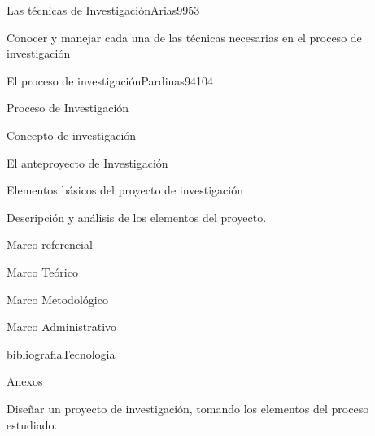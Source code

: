 \begin{syllabus}
\begin{unit}{Las técnicas de Investigación}{Arias99}{5}{3}
   \begin{unitgoals}
      \item Conocer y manejar cada una de las técnicas necesarias en el proceso de investigación
   \end{unitgoals}
\end{unit}

\begin{unit}{El proceso de investigación}{Pardinas94}{10}{4}
   \begin{topics}
      \item Proceso de Investigación
	\item Concepto de investigación
	\item El anteproyecto de Investigación 
	\item Elementos básicos del proyecto de investigación
	\item Descripción y análisis de los elementos del proyecto.
	\item Marco referencial
	\item Marco Teórico
	\item Marco Metodológico
	\item Marco Administrativo
	\item bibliografiaTecnologia 
	\item Anexos
   \end{topics}

   \begin{unitgoals}
      \item Diseñar un proyecto de investigación, tomando los elementos del proceso estudiado.
   \end{unitgoals}
\end{unit}

\begin{coursebibliography}
\end{coursebibliography}
\end{syllabus}
